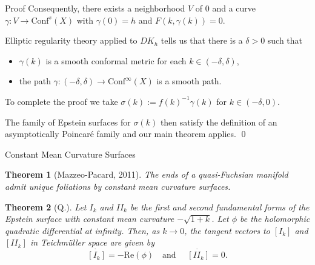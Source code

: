 \documentclass[professionalfont]{beamer}
\newtheorem*{thm*}{Theorem}
\newcommand{\two}{I\!I}
\begin{document}
\begin{frame}{Proof}
Consequently, there exists a neighborhood $V$ of $0$ and a curve $\gamma : V \to \mathrm{Conf}^s(X)$ with $\gamma(0) = h$ and $F(k, \gamma(k)) = 0$. 
\newline \pause

Elliptic regularity theory applied to $D K_h$ tells us that there is a $\delta >0$ such that 

\begin{itemize}

	\item $\gamma(k)$ is a smooth conformal metric for each $k \in (-\delta,\delta)$, \pause
	
	\item the path $\gamma: (-\delta,\delta) \to \mathrm{Conf}^\infty(X)$ is a smooth path. \pause
	
\end{itemize}
\vspace{0.5cm}

To complete the proof we take $\sigma(k) := f(k)^{-1}\gamma(k)$ for $k \in (-\delta,0)$.
\newline

The family of Epstein surfaces for $\sigma(k)$ then satisfy the definition of an asymptotically Poincar\'e family and our main theorem applies.  \qed
\end{frame}




\begin{frame}{Constant Mean Curvature Surfaces}

\begin{thm*}[Mazzeo-Pacard, 2011]
The ends of a quasi-Fuchsian manifold admit unique foliations by constant mean curvature surfaces. 
\end{thm*}
\vspace{0.5cm}

\begin{thm*}[Q.]
Let $I_k$ and $\two_k$ be the first and second fundamental forms of the Epstein surface with constant mean curvature $-\sqrt{1+k}$.
Let $\phi$ be the holomorphic quadratic differential at infinity. 
Then, as $k \to 0$, the tangent vectors to $[I_k]$ and $[\two_k]$ in Teichm\"uller space are given by 
\[
  \dot{[I_k]}= - \mathrm{Re}(\phi) \quad \text{and } \quad \dot{[\two_k]} = 0.
\]
\end{thm*}

\end{frame}
\end{document}
